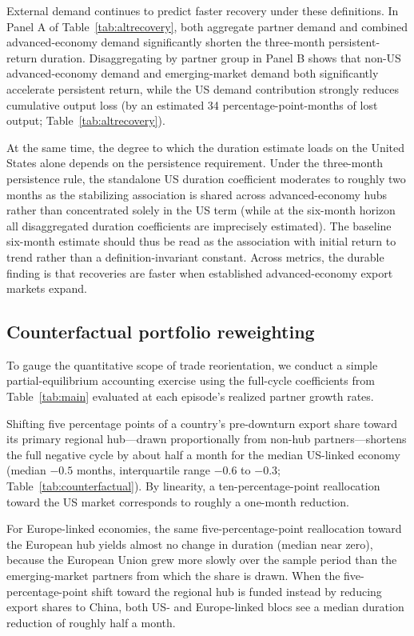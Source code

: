 \documentclass[12pt, a4paper]{article}
\begin{document}
External demand continues to predict faster recovery under these definitions. In Panel A of Table~\ref{tab:altrecovery}, both aggregate partner demand and combined advanced-economy demand significantly shorten the three-month persistent-return duration. Disaggregating by partner group in Panel B shows that non-US advanced-economy demand and emerging-market demand both significantly accelerate persistent return, while the US demand contribution strongly reduces cumulative output loss (by an estimated 34 percentage-point-months of lost output; Table~\ref{tab:altrecovery}).

At the same time, the degree to which the duration estimate loads on the United States alone depends on the persistence requirement. Under the three-month persistence rule, the standalone US duration coefficient moderates to roughly two months as the stabilizing association is shared across advanced-economy hubs rather than concentrated solely in the US term (while at the six-month horizon all disaggregated duration coefficients are imprecisely estimated). The baseline six-month estimate should thus be read as the association with initial return to trend rather than a definition-invariant constant. Across metrics, the durable finding is that recoveries are faster when established advanced-economy export markets expand.

\subsection{Counterfactual portfolio reweighting}

To gauge the quantitative scope of trade reorientation, we conduct a simple partial-equilibrium accounting exercise using the full-cycle coefficients from Table~\ref{tab:main} evaluated at each episode's realized partner growth rates.

Shifting five percentage points of a country's pre-downturn export share toward its primary regional hub---drawn proportionally from non-hub partners---shortens the full negative cycle by about half a month for the median US-linked economy (median $-0.5$ months, interquartile range $-0.6$ to $-0.3$; Table~\ref{tab:counterfactual}). By linearity, a ten-percentage-point reallocation toward the US market corresponds to roughly a one-month reduction.

For Europe-linked economies, the same five-percentage-point reallocation toward the European hub yields almost no change in duration (median near zero), because the European Union grew more slowly over the sample period than the emerging-market partners from which the share is drawn. When the five-percentage-point shift toward the regional hub is funded instead by reducing export shares to China, both US- and Europe-linked blocs see a median duration reduction of roughly half a month.
\end{document}
